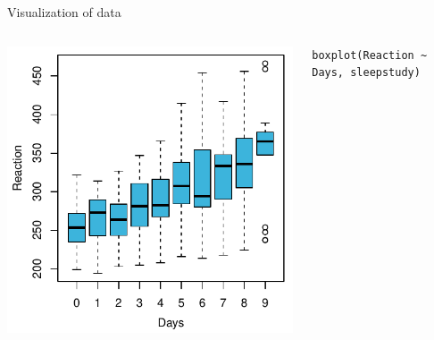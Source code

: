 \documentclass[aspectratio=169]{beamer}
\begin{document}
\begin{frame}[fragile]{Visualization of data}
  \begin{columns}
    \begin{column}{.53\textwidth}
      \includegraphics[scale=.8]{fig/sleep_box}
    \end{column}
    \begin{column}{.55\textwidth}
\begin{lstlisting}
boxplot(Reaction ~ Days, sleepstudy)
\end{lstlisting}
    \end{column}
  \end{columns}
\end{frame}
\end{document}
